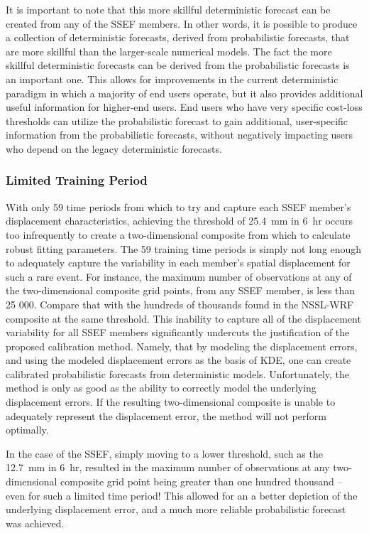 It is important to note that this more skillful deterministic forecast can be created from any of the SSEF members.
In other words, it is possible to produce a collection of deterministic forecasts, derived from probabilistic forecasts, that are more skillful than the larger-scale numerical models.
The fact the more skillful deterministic forecasts can be derived from the probabilistic forecasts is an important one.
This allows for improvements in the current deterministic paradigm in which a majority of end users operate, but it also provides additional useful information for higher-end users.
End users who have very specific cost-loss thresholds can utilize the probabilistic forecast to gain additional, user-specific information from the probabilistic forecasts, without negatively impacting users who depend on the legacy deterministic forecasts.




\subsubsection{Limited Training Period}


With only 59 time periods from which to try and capture each SSEF member's displacement characteristics, achieving the threshold of \mbox{25.4 mm} in \mbox{6 hr} occurs too infrequently to create a two-dimensional composite from which to calculate robust fitting parameters.
The 59 training time periods is simply not long enough to adequately capture the variability in each member's spatial displacement for such a rare event.
For instance, the maximum number of observations at any of the two-dimensional composite grid points, from any SSEF member, is less than 25 000.
Compare that with the hundreds of thousands found in the NSSL-WRF composite at the same threshold.
This inability to capture all of the displacement variability for all SSEF members significantly undercuts the justification of the proposed calibration method.
Namely, that by modeling the displacement errors, and using the modeled displacement errors as the basis of KDE, one can create calibrated probabilistic forecasts from deterministic models.
Unfortunately, the method is only as good as the ability to correctly model the underlying displacement errors.
If the resulting two-dimensional composite is unable to adequately represent the displacement error, the method will not perform optimally.


In the case of the SSEF, simply moving to a lower threshold, such as the \mbox{12.7 mm} in \mbox{6 hr}, resulted in the maximum number of observations at any two-dimensional composite grid point being greater than one hundred thousand -- even for such a limited time period!
This allowed for an a better depiction of the underlying displacement error, and a much more reliable probabilistic forecast was achieved.
